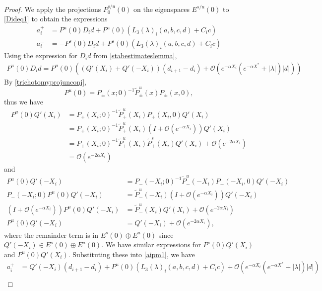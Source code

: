 \documentclass[thesis.tex]{subfiles}
\begin{document}
\begin{lemma}
\begin{proof}
We apply the projections $P_0^{s/u}(0)$ on the eigenspaces $E^{s/u}(0)$ to \eqref{Dideq1} to obtain the expressions
\begin{equation}\label{aipm1}
\begin{aligned}
a_i^+ &= P^u(0) D_i d + P^u(0) \left( L_3(\lambda)_i(a, b, c, d) +  C_i c \right) \\
a_i^- &= -P^s(0) D_i d + P^s(0) \left( L_3(\lambda)_i(a, b, c, d) + C_i c \right)
\end{aligned}
\end{equation}
Using the expression for $D_i d$ from \cref{stabestimateslemma}, 
\begin{align*}
P^u(0) D_i d = 
P^u(0) \left( ( Q'(X_i) + Q'(-X_i))(d_{i+1} - d_i ) + \mathcal{O}( e^{-\alpha X_i} (e^{-\alpha X^*} + |\lambda| )|d|) \right)
\end{align*}
By \cref{trichotomyprojunconj}, 
\begin{equation*}
P^u(0) = P_\pm(x; 0)^{-1} \tilde{P}^u_\pm(x) P_\pm(x, 0),
\end{equation*}
thus we have
\begin{align*}
P^u(0) Q'(X_i) &= P_+(X_i; 0)^{-1} \tilde{P}^u_+(X_i) P_+(X_i, 0) Q'(X_i) \\
&= P_+(X_i; 0)^{-1} \tilde{P}^u_+(X_i)( I + \mathcal{O}(e^{-\alpha X_i}))Q'(X_i) \\
&= P_+(X_i; 0)^{-1} \tilde{P}^u_+(X_i)\tilde{P}^s_+(X_i)Q'(X_i) + \mathcal{O}(e^{-2\alpha X_i}) \\
&= \mathcal{O}(e^{-2\alpha X_i})
\end{align*}
and 
\begin{align*}
P^u(0) Q'(-X_i) &= P_-(-X_i; 0)^{-1} \tilde{P}^u_-(-X_i) P_-(-X_i, 0) Q'(-X_i) \\
P_-(-X_i; 0) P^u(0) Q'(-X_i) &= \tilde{P}^u_-(-X_i)( I + \mathcal{O}(e^{-\alpha X_i}))Q'(-X_i) \\
( I + \mathcal{O}(e^{-\alpha X_i})) P^u(0) Q'(-X_i) &= \tilde{P}^u_-(X_i) Q'(X_i) + \mathcal{O}(e^{-2\alpha X_i}) \\
P^u(0) Q'(-X_i) &= Q'(-X_i) + \mathcal{O}(e^{-2\alpha X_i}),
\end{align*}
where the remainder term is in $E^s(0) \oplus E^u(0)$ since $Q'(-X_i) \in E^s(0) \oplus E^u(0)$. We have similar expressions for $P^s(0) Q'(X_i)$ and $P^u(0) Q'(X_i)$. Substituting these into \cref{aipm1}, we have 
\begin{equation}\label{aipm2}
\begin{aligned}
a_i^+ &= Q'(-X_i) (d_{i+1} - d_i ) + P^u(0) \left( L_3(\lambda)_i(a, b, c, d) + C_i c  \right) + \mathcal{O}( e^{-\alpha X_i} (e^{-\alpha X^*} + |\lambda| )|d|) \\

\end{aligned}
\end{equation}
\end{proof}
\end{lemma}
\end{document}
